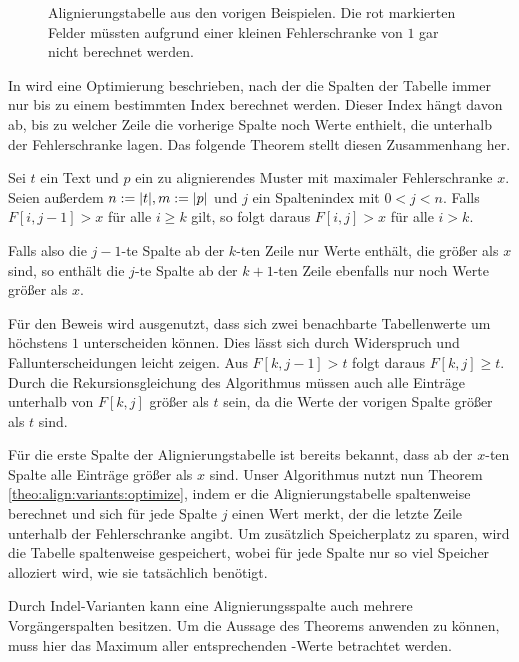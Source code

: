 \begin{figure}[htbp]
\caption{Alignierungstabelle aus den vorigen Beispielen. Die rot markierten Felder müssten aufgrund einer kleinen Fehlerschranke von $1$ gar nicht berechnet werden.}
\label{fig:align:basics:errors}
\end{figure}

In \citep{Rahmann2013} wird eine Optimierung beschrieben, nach der die Spalten der Tabelle immer nur bis zu einem bestimmten Index berechnet werden. Dieser Index hängt davon ab, bis zu welcher Zeile die vorherige Spalte noch Werte enthielt, die unterhalb der Fehlerschranke lagen. Das folgende Theorem stellt diesen Zusammenhang her.

\begin{theorem}
\label{theo:align:variants:optimize}
Sei $t$ ein Text und $p$ ein zu alignierendes Muster mit maximaler Fehlerschranke $x$. Seien außerdem $n := \lvert t \rvert, m := \lvert p \rvert$ und $j$ ein Spaltenindex mit $0 < j < n$. Falls $F[i,j-1] > x$ für alle $i \geq k$ gilt, so folgt daraus $F[i,j] > x$ für alle $i > k$.

Falls also die $j-1$-te Spalte ab der $k$-ten Zeile nur Werte enthält, die größer als $x$ sind, so enthält die $j$-te Spalte ab der $k+1$-ten Zeile ebenfalls nur noch Werte größer als $x$.
\end{theorem}

\begin{beweis}
Für den Beweis wird ausgenutzt, dass sich zwei benachbarte Tabellenwerte um höchstens $1$ unterscheiden können. Dies lässt sich durch Widerspruch und Fallunterscheidungen leicht zeigen. Aus $F[k,j-1] > t$ folgt daraus $F[k,j] \geq t$. Durch die Rekursionsgleichung des Algorithmus müssen auch alle Einträge unterhalb von $F[k,j]$ größer als $t$ sein, da die Werte der vorigen Spalte größer als $t$ sind.
\end{beweis}

Für die erste Spalte der Alignierungstabelle ist bereits bekannt, dass ab der $x$-ten Spalte alle Einträge größer als $x$ sind. Unser Algorithmus nutzt nun Theorem \ref{theo:align:variants:optimize}, indem er die Alignierungstabelle spaltenweise berechnet und sich für jede Spalte $j$ einen Wert  merkt, der die letzte Zeile unterhalb der Fehlerschranke angibt. Um zusätzlich Speicherplatz zu sparen, wird die Tabelle spaltenweise gespeichert, wobei für jede Spalte nur so viel Speicher alloziert wird, wie sie tatsächlich benötigt.

Durch Indel-Varianten kann eine Alignierungsspalte auch mehrere Vorgängerspalten besitzen. Um die Aussage des Theorems anwenden zu können, muss hier das Maximum aller entsprechenden -Werte betrachtet werden.
